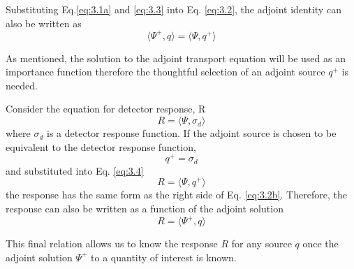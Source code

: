 Substituting Eq.\ref{eq:3.1a} and \ref{eq:3.3} into Eq. \ref{eq:3.2}, 
the adjoint identity can also be written as
\begin{equation} \label{eq:3.2b}
		\langle \Psi^{+} , q \rangle =
		\langle \Psi, q^{+} \rangle
\end{equation}

As mentioned, the solution to the adjoint transport
equation will be used as an importance function
therefore the thoughtful selection of an adjoint source $q^{+}$ is needed.

Consider the equation for detector response, R
\begin{equation} \label{eq:3.4}
		R = \langle \Psi, \sigma_{d}\rangle 
\end{equation}
where $\sigma_{d}$ is a detector response function.
If the adjoint source is chosen to be equivalent to the detector response
function,
\begin{equation} \label{eq:3.5}
		q^{+} = \sigma_{d}
\end{equation}
and substituted into Eq. \ref{eq:3.4}  
\begin{equation}\label{eq:resp_adjq}
		R = \langle \Psi, q^{+} \rangle %
\end{equation}
the response has the same form as the right side of Eq. \ref{eq:3.2b}.
Therefore, 
the response can also be written as a function of the adjoint solution
\begin{equation}\label{eq:resp_adjf}
		R = \langle \Psi^{+}, q \rangle
\end{equation}

This final relation allows us to know the response $R$ for any source $q$ once the
adjoint solution $\Psi^{+}$ to a quantity of interest is known.

